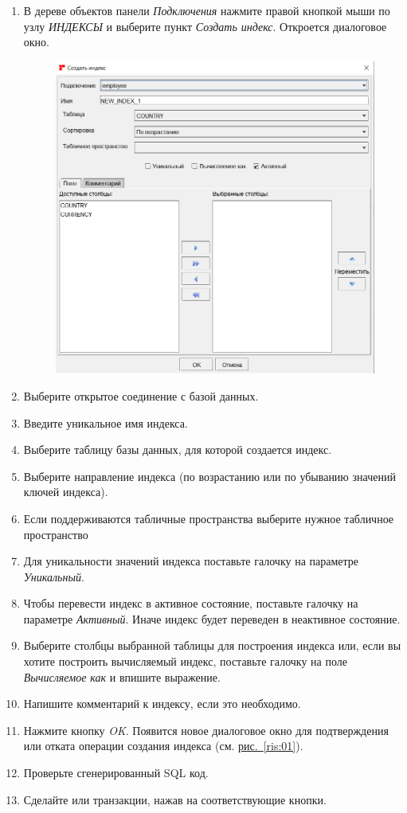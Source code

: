 \begin{enumerate}[leftmargin=26pt]
	\item В дереве объектов панели \textit{Подключения} нажмите правой кнопкой мыши по узлу \textit{ИНДЕКСЫ} и выберите пункт \textit{Создать индекс}. Откроется диалоговое окно.
	\begin{figure}[H]
		\centering
		\includegraphics[width = 0.75\linewidth]{img/create_index.png}
	\end{figure}	
	\item Выберите открытое соединение с базой данных.
	\item Введите уникальное имя индекса.
	\item Выберите таблицу базы данных, для которой создается индекс.
	\item Выберите направление индекса (по возрастанию или по убыванию значений ключей индекса).
	\item Если поддерживаются табличные пространства выберите нужное табличное пространство
	\item Для уникальности значений индекса поставьте галочку на параметре \textit{Уникальный}.
	\item Чтобы перевести индекс в активное состояние, поставьте галочку на параметре \textit{Активный}. Иначе индекс будет переведен в неактивное состояние.
	\item Выберите столбцы выбранной таблицы для построения индекса или, если вы хотите построить вычисляемый индекс, поставьте галочку на поле \textit{Вычисляемое как} и впишите выражение.
	\item Напишите комментарий к индексу, если это необходимо.
	\item Нажмите кнопку \textit{OK}. Появится новое диалоговое окно для подтверждения или отката операции создания индекса (см. \hyperref[ris:01]{рис.~\ref{ris:01}}).
	\item Проверьте сгенерированный SQL код.
	\item Сделайте  или  транзакции, нажав на соответствующие кнопки.
\end{enumerate}

